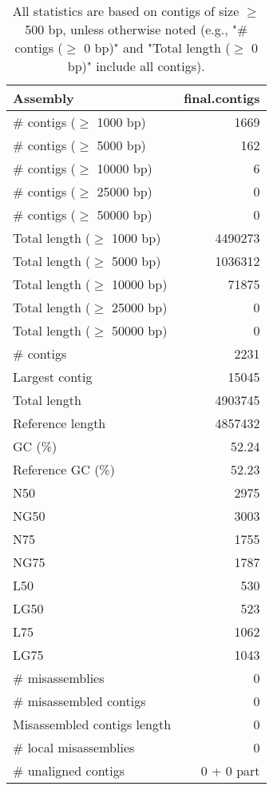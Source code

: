 \documentclass[12pt,a4paper]{article}
\begin{document}
\begin{table}[ht]
\begin{center}
\caption{All statistics are based on contigs of size $\geq$ 500 bp, unless otherwise noted (e.g., "\# contigs ($\geq$ 0 bp)" and "Total length ($\geq$ 0 bp)" include all contigs).}
\begin{tabular}{|l*{1}{|r}|}
\hline
Assembly & final.contigs \\ \hline
\# contigs ($\geq$ 1000 bp) & 1669 \\ \hline
\# contigs ($\geq$ 5000 bp) & 162 \\ \hline
\# contigs ($\geq$ 10000 bp) & 6 \\ \hline
\# contigs ($\geq$ 25000 bp) & 0 \\ \hline
\# contigs ($\geq$ 50000 bp) & 0 \\ \hline
Total length ($\geq$ 1000 bp) & 4490273 \\ \hline
Total length ($\geq$ 5000 bp) & 1036312 \\ \hline
Total length ($\geq$ 10000 bp) & 71875 \\ \hline
Total length ($\geq$ 25000 bp) & 0 \\ \hline
Total length ($\geq$ 50000 bp) & 0 \\ \hline
\# contigs & 2231 \\ \hline
Largest contig & 15045 \\ \hline
Total length & 4903745 \\ \hline
Reference length & 4857432 \\ \hline
GC (\%) & 52.24 \\ \hline
Reference GC (\%) & 52.23 \\ \hline
N50 & 2975 \\ \hline
NG50 & 3003 \\ \hline
N75 & 1755 \\ \hline
NG75 & 1787 \\ \hline
L50 & 530 \\ \hline
LG50 & 523 \\ \hline
L75 & 1062 \\ \hline
LG75 & 1043 \\ \hline
\# misassemblies & 0 \\ \hline
\# misassembled contigs & 0 \\ \hline
Misassembled contigs length & 0 \\ \hline
\# local misassemblies & 0 \\ \hline
\# unaligned contigs & 0 + 0 part \\ \hline

\end{tabular}
\end{center}
\end{table}
\end{document}
